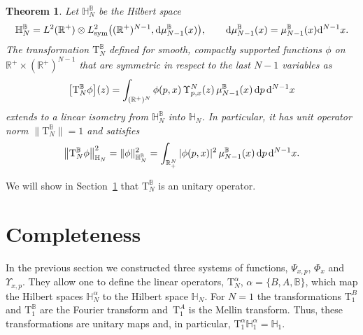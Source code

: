 \documentclass[pdftex]{sigma}%
\numberwithin{equation}{section}
\newtheorem{Theorem}{Theorem}[section]
\begin{document}
\begin{Theorem}
Let $\mathbb H_N^{\mathbb B}$ be the Hilbert space
\begin{gather*}
\mathbb H_N^{\mathbb B} =L^2(\mathbb R^+)\otimes
L^2_{\rm sym}\big( (\mathbb R^+)^{N-1}, {\rm d}\mu^{\mathbb B}_{N-1}(x)\big),\qquad
{\rm d}\mu^{\mathbb B}_{N-1}(x)=\mu^{\mathbb B}_{N-1}(x) {\rm d}^{N-1}x.
\end{gather*}
The transformation $\mathrm T_N^{\mathbb B}$ defined for smooth, compactly supported functions $\phi$ on $\mathbb{R}^+\times
(\mathbb{R}^+)^{N-1}$ that are symmetric in respect to the last $N-1$ variables as
\begin{gather*}%
\big[ \mathrm T_N^{\mathbb B} \phi\big](z)=\int_{ (\mathbb R^+)^{N}} \phi(p, x)\, \Upsilon^N_{p,{x}}( z)\, \mu_{N-1}^{\mathbb B}( x) \, {\rm d}p\, {\rm d}^{N-1} x
\end{gather*}
extends to a linear isometry from $\mathbb H_N^{\mathbb B}$ into $\mathbb H_N$. In particular, it has unit operator norm \mbox{$\big\|\mathrm T_{N}^{\mathbb B}\big\|=1$} and satisfies
\begin{gather*}
\big\| \mathrm T_N^{\mathbb B} \phi\big\|^2_{ \mathbb H_N } = \| \phi\|^2_{ \mathbb H_N^{\mathbb B} } =
\int_{\mathbb R_+^{N}} |\phi(p, x)|^2\, \mu_{N-1}^{\mathbb B}( x)\, {\rm d}p\,{\rm d}^{N-1} x.
\end{gather*}
\end{Theorem}

We will show in Section~\ref{Section Completude} that $\mathrm T_N^{\mathbb B}$ is an unitary operator.


\section{Completeness}
\label{Section Completude}

In the previous section we constructed three systems of functions, $\Psi_{x,p}$, $\Phi_x$ and $\Upsilon_{x,p}$. They allow one to define
the linear operators, $\mathrm T_N^\alpha$, $\alpha=\{B,A,{\mathbb B}\}$, which map the Hilbert spaces $\mathbb H_N^\alpha$ to the
Hilbert space $\mathbb H_N$. For $N=1$ the transformations $\mathrm T_{1}^B$ and $\mathrm T_{1}^{\mathbb B}$ are the Fourier transform and~$\mathrm T_{1}^{A}$ is the Mellin transform. Thus, these transformations are unitary maps and, in particular, $\mathrm T_{1}^\alpha \mathbb
H_{1}^\alpha=\mathbb H_{1}$.
\end{document}
